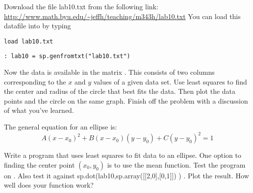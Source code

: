 \begin{problem}
Download the file lab10.txt from the following link:
\url{http://www.math.byu.edu/~jeffh/teaching/m343h/lab10.txt}
You can load this datafile into \ProgrammingLanguage by typing
\begin{matlab}
\begin{lstlisting}[style=matlab]
 load lab10.txt
\end{lstlisting}
\end{matlab}
\begin{python}
\begin{lstlisting}[style=python]
: lab10 = sp.genfromtxt("lab10.txt")
\end{lstlisting}
\end{python}
Now the data is available in the matrix .  This consists of two columns corresponding to the $x$ and $y$ values of a given data set.  Use least squares to find the center and radius of the circle that best fits the data.  Then plot the data points and the circle on the same graph.  Finish off the problem with a discussion of what you've learned.
\end{problem}

\begin{problem}
The general equation for an ellipse is:
\[
A(x-x_0)^2 + B(x-x_0)(y-y_0) + C(y-y_0)^2 = 1
\]

Write a program that uses least squares to fit data to an ellipse. One option to finding the center point $(x_0,y_0)$ is to use the mean function. Test the program on . Also test it against sp.dot(lab10,sp.array([[2,0],[0,1]]) ) . Plot the result. How well does your function work?
\end{problem}
